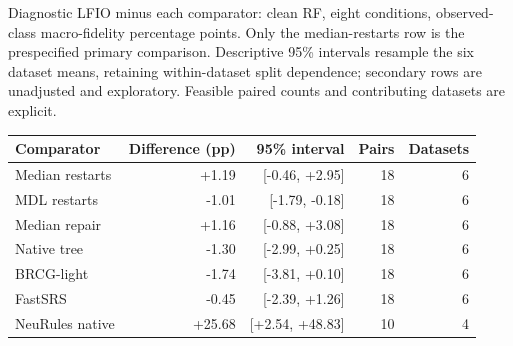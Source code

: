 \begin{kbtable}
\centering
\caption{Diagnostic LFIO minus each comparator: clean RF, eight conditions, observed-class macro-fidelity percentage points. Only the median-restarts row is the prespecified primary comparison. Descriptive 95\% intervals resample the six dataset means, retaining within-dataset split dependence; secondary rows are unadjusted and exploratory. Feasible paired counts and contributing datasets are explicit.}
\label{tab:independent-paired}
\small
\begin{adjustbox}{max width=\linewidth}
\begin{tabular}{lrrrr}
\toprule
Comparator & Difference (pp) & 95\% interval & Pairs & Datasets \\
\midrule
Median restarts & +1.19 & [-0.46, +2.95] & 18 & 6 \\
MDL restarts & -1.01 & [-1.79, -0.18] & 18 & 6 \\
Median repair & +1.16 & [-0.88, +3.08] & 18 & 6 \\
Native tree & -1.30 & [-2.99, +0.25] & 18 & 6 \\
BRCG-light & -1.74 & [-3.81, +0.10] & 18 & 6 \\
FastSRS & -0.45 & [-2.39, +1.26] & 18 & 6 \\
NeuRules native & +25.68 & [+2.54, +48.83] & 10 & 4 \\
\bottomrule
\end{tabular}
\end{adjustbox}
\end{kbtable}
